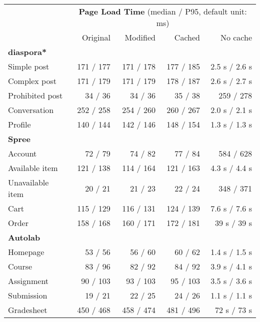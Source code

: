 \begin{tabular}{lrrrr}
\toprule
& \multicolumn{4}{c}{\textbf{Page Load Time} (median / P95, default unit: ms)} \\
\cmidrule(lr){2-5}
& Original & Modified & Cached & No cache \\ \midrule
\textbf{diaspora*}\\
    \quad{}Simple post & 171 / 177 & 171 / 178 & 177 / 185 & 2.5 s / 2.6 s \\
    \quad{}Complex post & 171 / 179 & 171 / 179 & 178 / 187 & 2.6 s / 2.7 s \\
    \quad{}Prohibited post & 34 / 36 & 34 / 36 & 35 / 38 & 259 / 278 \\
    \quad{}Conversation & 252 / 258 & 254 / 260 & 260 / 267 & 2.0 s / 2.1 s \\
    \quad{}Profile & 140 / 144 & 142 / 146 & 148 / 154 & 1.3 s / 1.3 s \\
\textbf{Spree}\\
    \quad{}Account & 72 / 79 & 74 / 82 & 77 / 84 & 584 / 628 \\
    \quad{}Available item & 121 / 138 & 114 / 164 & 121 / 163 & 4.3 s / 4.4 s \\
    \quad{}Unavailable item & 20 / 21 & 21 / 23 & 22 / 24 & 348 / 371 \\
    \quad{}Cart & 115 / 129 & 116 / 131 & 124 / 139 & 7.6 s / 7.6 s \\
    \quad{}Order & 158 / 168 & 160 / 171 & 172 / 181 & 39 s / 39 s \\
\textbf{Autolab}\\
    \quad{}Homepage & 53 / 56 & 56 / 60 & 60 / 62 & 1.4 s / 1.5 s \\
    \quad{}Course & 83 / 96 & 82 / 92 & 84 / 92 & 3.9 s / 4.1 s \\
    \quad{}Assignment & 90 / 103 & 93 / 103 & 95 / 103 & 3.5 s / 3.6 s \\
    \quad{}Submission & 19 / 21 & 22 / 25 & 24 / 26 & 1.1 s / 1.1 s \\
    \quad{}Gradesheet & 450 / 468 & 458 / 474 & 481 / 496 & 72 s / 73 s \\
\bottomrule
\end{tabular}
